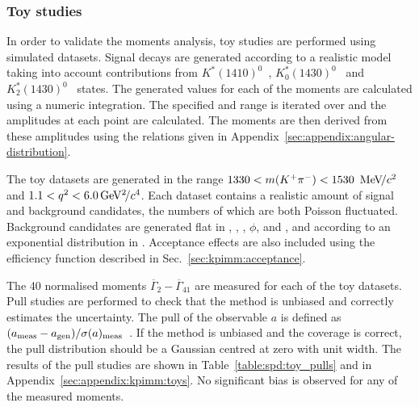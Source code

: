 \subsubsection{Toy studies}
\label{sec:kpimm:angular-analysis:toys}

In order to validate the moments analysis, toy studies are performed using simulated datasets. Signal decays are generated according to a realistic model taking into account contributions from $K^\ast(1410)^0$~\cite{Zwicky-K_1_1410}, $K^\ast_0(1430)^0$~\cite{Wang-K_0_1430} and $K^\ast_2(1430)^0$~\cite{Wang-K_2_1430} states. The generated values for each of the moments are calculated using a numeric integration. The specified \mkpi and \qsq range is iterated over and the amplitudes at each point are calculated. The moments are then derived from these amplitudes using the relations given in Appendix~\ref{sec:appendix:angular-distribution}.

The toy datasets are generated in the range $1330<m({{K}^+}{{\pi}^-})<1530~{\mathrm{\,Me\kern -0.1em V\!/}c^2}$ and $1.1<{q^2}<6.0{\mathrm{\,Ge\kern -0.1em V^2\!/}c^4}$. Each dataset contains a realistic amount of signal and background candidates, the numbers of which are both Poisson fluctuated. Background candidates are generated flat in \qsq, \ctl, \ctk, $\phi$, and \mkpi, and according to an exponential distribution in \mkpimm. Acceptance effects are also included using the efficiency function described in Sec.~\ref{sec:kpimm:acceptance}.
 
The 40 normalised moments $\overline{\Gamma}_{2}-\overline{\Gamma}_{41}$ are measured for each of the toy datasets. Pull studies are performed to check that the method is unbiased and correctly estimates the uncertainty. The pull of the observable $a$ is defined as $(a_{\rm meas}-a_{\rm gen})/\sigma(a)_{\rm meas}$~\cite{lyons-pulls}. If the method is unbiased and the coverage is correct, the pull distribution should be a Gaussian centred at zero with unit width. The results of the pull studies are shown in Table~\ref{table:spd:toy_pulls} and in Appendix~\ref{sec:appendix:kpimm:toys}. No significant bias is observed for any of the measured moments.

